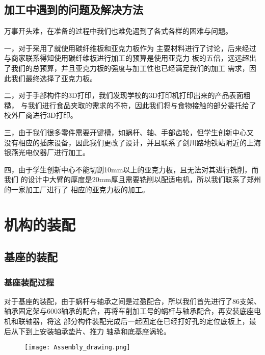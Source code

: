 \subsection{加工中遇到的问题及解决方法}

{\songti 万事开头难，在准备的过程中我们也难免遇到了各式各样的困难与问题。}

{\songti 一，对于采用了就使用碳纤维板和亚克力板作为
主要材料进行了讨论，后来经过与商家联系得知使用碳纤维板进行加工的预算是使用亚克力
板的五倍，远远超出了我们的总预算，并且亚克力板的强度与加工性也已经满足我们的加工
需求，因此我们最终选择了亚克力板。}

{\songti 二，对于手部构件的3D打印，我们发现学校的3D打印机打印出来的产品表面粗糙，
与我们进行食品夹取的需求的不符，因此我们将与食物接触的部分委托给了校外厂商进行3D打印。}

{\songti 三，由于我们很多零件需要开键槽，如蜗杆、轴、手部齿轮，但学生创新中心又
没有相应的插床设备，因此我们更改了设计，并且联系了剑川路地铁站附近的上海银燕光电仪器厂进行加工。}

{\songti 四，由于学生创新中心不能切割10mm以上的亚克力板，且无法对其进行铣削，而我们
的设计中大臂的厚度是20mm厚且需要铣削以配适电机，所以我们联系了郑州的一家加工厂进行了
相应的亚克力板的加工。}


\section{机构的装配}

\subsection{基座的装配}

\subsubsection{基座装配过程}

{\songti 对于基座的装配，由于蜗杆与轴承之间是过盈配合，所以我们首先进行了86支架、
轴承固定架与6003轴承的配合，再将车削加工号的蜗杆与轴承配合，再安装底座电机和联轴器，将这
部分构件装配完成后一起固定在已经打好孔的定位底板上，最后从下到上安装轴承垫片、推力
轴承和底基座涡轮。}

\begin{figure}[!htp]
    \centering
    \texttt{[image: Assembly\_drawing.png]}
    \label{fig:基座装配图}
\end{figure}

